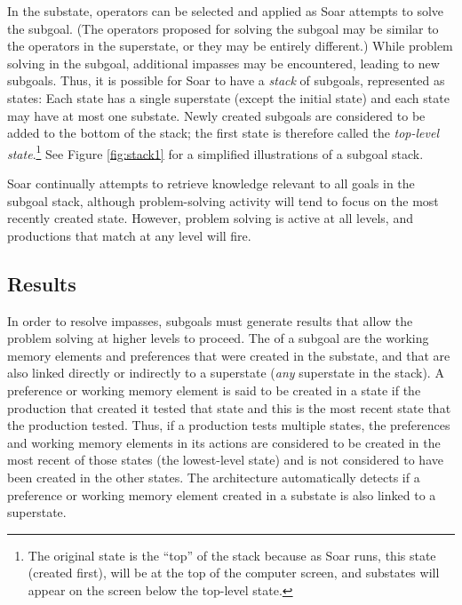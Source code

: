 In the substate, operators can be selected and applied as Soar attempts to solve the subgoal. (The operators proposed for solving the subgoal may be similar to the operators in the superstate, or they may be entirely different.) While problem solving in the subgoal, additional impasses may be encountered, leading to new subgoals.  Thus, it is possible for Soar to have a \emph{stack} of subgoals, represented as states: Each state has  a single superstate (except the initial state) and each state may have at most one substate. Newly created subgoals are considered to be added to the bottom of the stack; the first state is therefore called the \emph{top-level state}.\footnote{
	The original state is the ``top'' of the stack because as Soar runs, this state (created first), will be at the top of the computer screen, and substates will appear on the screen below the top-level state.
} See Figure \ref{fig:stack1} for a simplified illustrations of a subgoal stack.

Soar continually attempts to retrieve knowledge relevant to all goals in the subgoal stack, although problem-solving activity will tend to focus on the most recently created state. However, problem solving is active at all levels, and productions that match at any level will fire.

\subsection{Results}
\label{ARCH-impasses-results}

In order to resolve impasses, subgoals must generate results that allow the problem solving at higher levels to proceed.  The  of a subgoal are the working memory elements and preferences that were created in the substate, and that are also linked directly or indirectly to a superstate (\emph{any} superstate in the stack). A preference or working memory element is said to be created in a state if the production that created it tested that state and this is the most recent state that the production tested. Thus, if a production tests multiple states, the preferences and working memory elements in its actions are considered to be created in the most recent of those states (the lowest-level state) and is not considered to have been created in the other states. The architecture automatically detects if a preference or working memory element created in a substate is also linked to a superstate.

